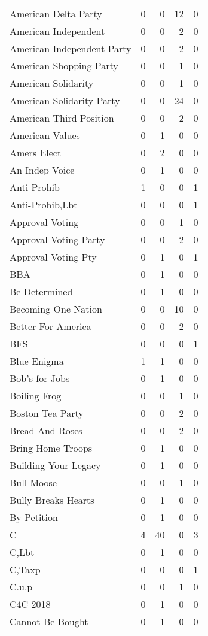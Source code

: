 \begin{supertabular}{lrrrr}
American Delta Party & 0 & 0 & 12 & 0\\
American Independent & 0 & 0 & 2 & 0\\
American Independent Party & 0 & 0 & 2 & 0\\
American Shopping Party & 0 & 0 & 1 & 0\\
American Solidarity & 0 & 0 & 1 & 0\\
American Solidarity Party & 0 & 0 & 24 & 0\\
American Third Position & 0 & 0 & 2 & 0\\
American Values & 0 & 1 & 0 & 0\\
Amers Elect & 0 & 2 & 0 & 0\\
An Indep Voice & 0 & 1 & 0 & 0\\
Anti-Prohib & 1 & 0 & 0 & 1\\
Anti-Prohib,Lbt & 0 & 0 & 0 & 1\\
Approval Voting & 0 & 0 & 1 & 0\\
Approval Voting Party & 0 & 0 & 2 & 0\\
Approval Voting Pty & 0 & 1 & 0 & 1\\
BBA & 0 & 1 & 0 & 0\\
Be Determined & 0 & 1 & 0 & 0\\
Becoming One Nation & 0 & 0 & 10 & 0\\
Better For America & 0 & 0 & 2 & 0\\
BFS & 0 & 0 & 0 & 1\\
Blue Enigma & 1 & 1 & 0 & 0\\
Bob's for Jobs & 0 & 1 & 0 & 0\\
Boiling Frog & 0 & 0 & 1 & 0\\
Boston Tea Party & 0 & 0 & 2 & 0\\
Bread And Roses & 0 & 0 & 2 & 0\\
Bring Home Troops & 0 & 1 & 0 & 0\\
Building Your Legacy & 0 & 1 & 0 & 0\\
Bull Moose & 0 & 0 & 1 & 0\\
Bully Breaks Hearts & 0 & 1 & 0 & 0\\
By Petition & 0 & 1 & 0 & 0\\
C & 4 & 40 & 0 & 3\\
C,Lbt & 0 & 1 & 0 & 0\\
C,Taxp & 0 & 0 & 0 & 1\\
C.u.p & 0 & 0 & 1 & 0\\
C4C 2018 & 0 & 1 & 0 & 0\\
Cannot Be Bought & 0 & 1 & 0 & 0\\

\end{supertabular}
